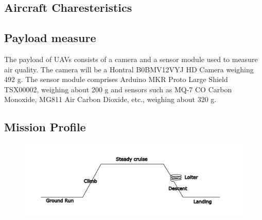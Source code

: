 \documentclass{article}
\begin{document}
\subsection{Aircraft Charesteristics}
\begin{table}[h]
\centering
{}
\end{table}

\newpage
\subsection{Payload measure}
The payload of UAVs consists of a camera and a sensor module used to measure air quality. The camera will be a Hontral B0BMV12VYJ HD Camera weighing 492 g. The sensor module comprises Arduino MKR Proto Large Shield TSX00002, weighing about 200 g and sensors such as MQ-7 CO Carbon Monoxide, MG811 Air Carbon Dioxide, etc., weighing about 320 g.

\subsection{Mission Profile}

\begin{figure}[h]
    \centering
    \includegraphics[width=\linewidth]{Mission Profile.png}
\end{figure}
\end{document}
